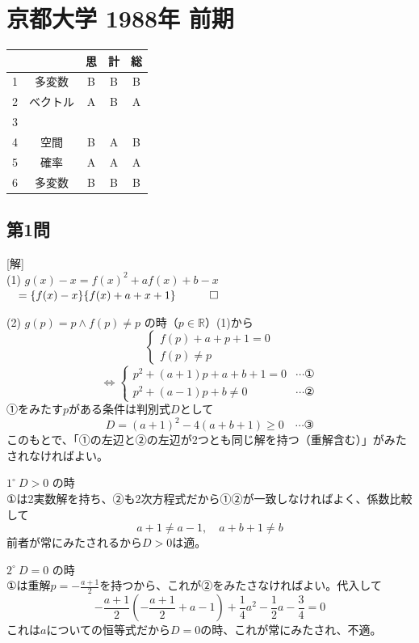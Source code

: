 \documentclass[../main.tex]{subfiles}
\begin{document}
\section*{京都大学 1988年 前期}

\begin{center}
  \begin{tabular}{|c|c|c|c|c|}
    \hline
    & & 思 & 計 & 総 \\ \hline
    1 & 多変数 & B & B & B \\ \hline
    2 & ベクトル & A & B & A \\ \hline
    3 & & & & \\ \hline
    4 & 空間 & B & A & B \\ \hline
    5 & 確率 & A & A & A \\ \hline
    6 & 多変数 & B & B & B \\ \hline
  \end{tabular}
\end{center}

\subsection*{第1問}
[解]\\
(1) $g(x)-x = f(x)^2+af(x)+b-x$\\
$\quad= \{f(x)-x\}\{f(x)+a+x+1\} \quad \qed$

(2) $g(p)=p \land f(p) \neq p$ の時（$p \in \mathbb{R}$）(1)から
\[
  \begin{cases}
    f(p)+a+p+1=0 \\
    f(p) \neq p
  \end{cases}
\]
\[
  \Leftrightarrow
  \begin{cases}
    p^2+(a+1)p+a+b+1=0 & \cdots \text{①} \\
    p^2+(a-1)p+b \neq 0 & \cdots \text{②}
  \end{cases}
\]
①をみたす$p$がある条件は判別式$D$として
\[ D = (a+1)^2-4(a+b+1) \ge 0 \quad \cdots \text{③} \]
このもとで、「①の左辺と②の左辺が2つとも同じ解を持つ（重解含む）」がみたされなければよい。

$1^\circ \ D>0$ の時\\
①は2実数解を持ち、②も2次方程式だから①②が一致しなければよく、係数比較して
\[ a+1 \neq a-1, \quad a+b+1 \neq b \]
前者が常にみたされるから$D>0$は適。

$2^\circ \ D=0$ の時\\
①は重解$p=-\frac{a+1}{2}$を持つから、これが②をみたさなければよい。代入して
\[ -\frac{a+1}{2}\left(-\frac{a+1}{2}+a-1\right)+\frac{1}{4}a^2-\frac{1}{2}a-\frac{3}{4}=0 \]
これは$a$についての恒等式だから$D=0$の時、これが常にみたされ、不適。
\end{document}
